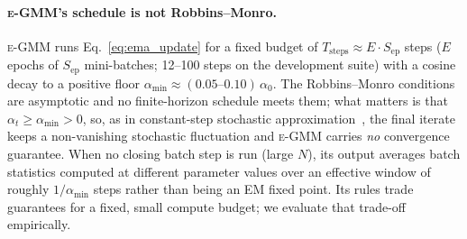\documentclass[10pt]{article} %
\newcommand{\egmm}{\textsc{e-GMM}}
\begin{document}
\paragraph{\egmm{}'s schedule is not Robbins--Monro.} \egmm{} runs Eq.~\eqref{eq:ema_update} for a fixed budget of $T_{\mathrm{steps}} \approx E \cdot S_{\mathrm{ep}}$ steps ($E$ epochs of $S_{\mathrm{ep}}$ mini-batches; 12--100 steps on the development suite) with a cosine decay to a positive floor $\alpha_{\min} \approx (0.05\text{--}0.10)\,\alpha_0$. The Robbins--Monro conditions are asymptotic and no finite-horizon schedule meets them; what matters is that $\alpha_t \ge \alpha_{\min} > 0$, so, as in constant-step stochastic approximation~\citep{dieuleveut2020bridging}, the final iterate keeps a non-vanishing stochastic fluctuation and \egmm{} carries \emph{no} convergence guarantee. When no closing batch step is run (large $N$), its output averages batch statistics computed at different parameter values over an effective window of roughly $1/\alpha_{\min}$ steps rather than being an EM fixed point. Its rules trade guarantees for a fixed, small compute budget; we evaluate that trade-off empirically.
\end{document}
